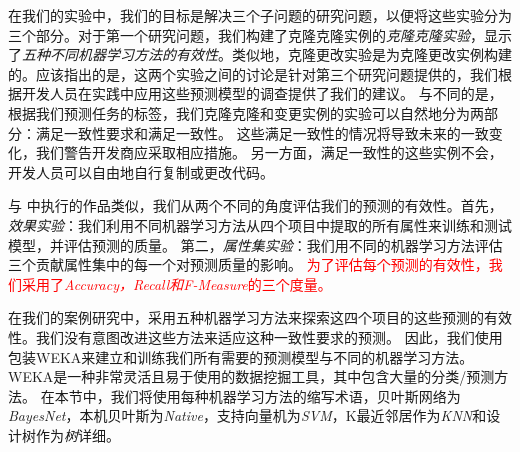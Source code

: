 在我们的实验中，我们的目标是解决三个子问题的研究问题，以便将这些实验分为三个部分。对于第一个研究问题，我们构建了克隆克隆实例的{\em 克隆克隆实验}，显示了{\em 五种不同机器学习方法的有效性}。类似地，克隆更改实验是为克隆更改实例构建的。应该指出的是，这两个实验之间的讨论是针对第三个研究问题提供的，我们根据开发人员在实践中应用这些预测模型的调查提供了我们的建议。
与不同的是，根据我们预测任务的标签，我们克隆克隆和变更实例的实验可以自然地分为两部分：满足一致性要求和满足一致性。
这些满足一致性的情况将导致未来的一致变化，我们警告开发商应采取相应措施。
另一方面，满足一致性的这些实例不会，开发人员可以自由地自行复制或更改代码。

与\cite{wang2014predicting} \cite{zhang2016predicting}中执行的作品类似，我们从两个不同的角度评估我们的预测的有效性。首先，{\em  效果实验\/}：我们利用不同机器学习方法从四个项目中提取的所有属性来训练和测试模型，并评估预测的质量。
第二，{\em 属性集实验\/}：我们用不同的机器学习方法评估三个贡献属性集中的每一个对预测质量的影响。
\textcolor{red}{为了评估每个预测的有效性，我们采用了{\em Accuracy，Recall和F-Measure}的三个度量。}

在我们的案例研究中，采用五种机器学习方法来探索这四个项目的这些预测的有效性。我们没有意图改进这些方法来适应这种一致性要求的预测。
因此，我们使用包装WEKA来建立和训练我们所有需要的预测模型与不同的机器学习方法。WEKA是一种非常灵活且易于使用的数据挖掘工具，其中包含大量的分类/预测方法\cite{hall2009weka}。
在本节中，我们将使用每种机器学习方法的缩写术语，贝叶斯网络为{\em BayesNet}，本机贝叶斯为{\em Native}，支持向量机为{\em SVM}，K最近邻居作为{\em KNN}和设计树作为{\em 树}详细。

